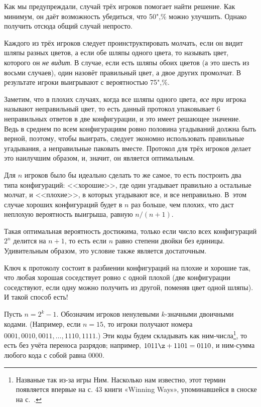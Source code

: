 \documentclass[twoside]{book}
\begin{document}
Как мы предупреждали, случай трёх игроков помогает найти решение.
Как минимум, он даёт возможность убедиться, что 50",\% можно улучшить.
Однако получить отсюда общий случай непросто.

Каждого из трёх игроков следует проинструктировать молчать, если он видит шляпы разных цветов,
а если обе шляпы одного цвета, то называть цвет, которого он \emph{не видит}.
В случае, если есть шляпы обоих цветов (а это шесть из восьми случаев), один назовёт правильный цвет, а двое других промолчат.
В результате игроки выигрывают с вероятностью 75",\%.

Заметим, что в плохих случаях, когда все шляпы одного цвета, \emph{все три} игрока называют неправильный цвет, то есть данный протокол
упаковывает 6 неправильных ответов в две конфигурации, и это имеет
решающее значение.
Ведь в среднем по всем конфигурациям ровно
половина угадываний должна быть верной, поэтому, чтобы выиграть,
следует экономно использовать правильные угадывания, а неправильные
паковать вместе.
Протокол для трёх игроков делает это наилучшим
образом, и, значит, он является оптимальным.

Для $n$ игроков было бы идеально сделать то же самое, то есть построить
два типа конфигураций: <<хорошие>>, где один угадывает правильно а
остальные молчат, и <<плохие>>, в которых угадывают все, и все
неправильно.
В~этом случае хороших конфигураций будет в $n$ раз
больше, чем плохих, что даст неплохую вероятность выигрыша, равную
$n/(n+1)$.

Такая оптимальная вероятность достижима, только если число всех
конфигураций $2^n$ делится на $n+1$, то есть если $n$ равно степени
двойки без единицы.
Удивительным образом, это условие также является
достаточным.

Ключ к протоколу состоит в разбиении конфигураций на плохие и хорошие так, что любая хорошая соседствует ровно с одной плохой (две конфигурации соседствуют, если одну можно получить из другой, поменяв цвет одной шляпы).
И такой способ есть!

Пусть $n=2^k-1$.
Обозначим игроков ненулевыми $k$-значными двоичными
кодами.
(Например, если $n=15$, то игроки получают номера
$0001,0010,0011,\dots,1110,1111$.)  Эти коды будем складывать как
ним-числа\footnote{Названые так из-за игры Ним.
Насколько нам
известно, этот  термин появляется впервые на с. 43 книги
«Winning Ways», упоминавшейся в сноске на
с.~\pageref{winningways}.}, то есть без учёта переноса разрядов; например, $1011 \z+ 1101 =0110$, и ним-сумма любого кода с собой равна $0000$.
\end{document}
